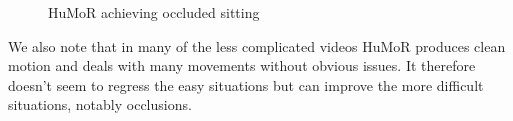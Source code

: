 \begin{figure}[!ht]
    \centering
    \hfil
    \hfil
    \caption{HuMoR achieving occluded sitting}
    \label{fig:humor_sitting}
\end{figure}

We also note that in many of the less complicated videos HuMoR produces clean motion and deals with many movements without obvious issues. It therefore doesn't seem to regress the easy situations but can improve the more difficult situations, notably occlusions.


